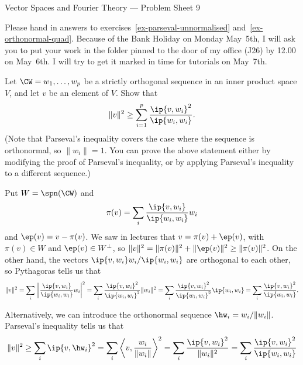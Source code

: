 

\begin{center}
 {\huge Vector Spaces and Fourier Theory ---
   Problem Sheet 9
 }
\end{center}

\begin{rubric}
 Please hand in answers to exercises~\ref{ex-parseval-unnormalised}
 and~\ref{ex-orthonormal-quad}.  Because of the Bank Holiday on Monday
 May~5th, I will ask you to put your work in the folder pinned to the
 door of my office (J26) by 12.00 on May~6th.  I will try to get it
 marked in time for tutorials on May~7th. 
\end{rubric}

\begin{exercise}\label{ex-parseval-unnormalised}
 Let $\CW=w_1,\dotsc,w_p$ be a strictly orthogonal sequence in an
 inner product space $V$, and let $v$ be an element of $V$.  Show that 
 \[ \|v\|^2 \geq \sum_{i=1}^p \frac{\ip{v,w_i}^2}{\ip{w_i,w_i}}. \]
 (Note that Parseval's inequality covers the case where the sequence
 is orthonormal, so $\|w_i\|=1$.  You can prove the above statement
 either by modifying the proof of Parseval's inequality, or by
 applying Parseval's inequality to a different sequence.)
\end{exercise}
\begin{solution}
 Put $W=\spn(\CW)$ and  
 \[ \pi(v) = \sum_i \frac{\ip{v,w_i}}{\ip{w_i,w_i}} w_i \]
 and $\ep(v)=v-\pi(v)$.  We saw in lectures that $v=\pi(v)+\ep(v)$,
 with $\pi(v)\in W$ and $\ep(v)\in W^\perp$, so
 $\|v\|^2=\|\pi(v)\|^2+\|\ep(v)\|^2\geq\|\pi(v)\|^2$.  On the other
 hand, the vectors $\ip{v,w_i}w_i/\ip{w_i,w_i}$ are orthogonal to each
 other, so Pythagoras tells us that
 \[ \|v\|^2 =
     \sum_i \left\| \frac{\ip{v,w_i}}{\ip{w_i,w_i}} w_i\right|^2 = 
     \sum_i \frac{\ip{v,w_i}^2}{\ip{w_i,w_i}^2} \|w_i\|^2 = 
     \sum_i \frac{\ip{v,w_i}^2}{\ip{w_i,w_i}^2} \ip{w_i,w_i} = 
     \sum_i \frac{\ip{v,w_i}^2}{\ip{w_i,w_i}}.
 \]

 Alternatively, we can introduce the orthonormal sequence
 $\hw_i=w_i/\|w_i\|$.  Parseval's inequality tells us that 
 \[ \|v\|^2 \geq \sum_i \ip{v,\hw_i}^2
     = \sum_i \left\langle v,\frac{w_i}{\|w_i\|}\right\rangle^2
     = \sum_i \frac{\ip{v,w_i}^2}{\|w_i\|^2} 
     = \sum_i \frac{\ip{v,w_i}^2}{\ip{w_i,w_i}} 
 \]
\end{solution}

